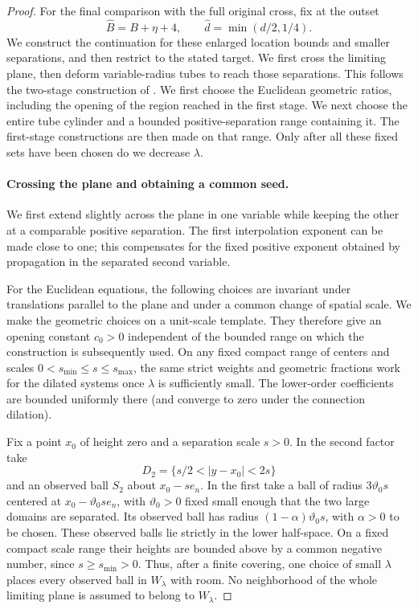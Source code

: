 \begin{proof}
For the final comparison with the full original cross, fix at the outset
\[
 \widehat B=B+\eta+4,\qquad
 \widehat d=\min(d/2,1/4).
\]
We construct the continuation for these enlarged location bounds and
smaller separations, and then restrict to the stated target.
We first cross the limiting plane, then deform variable-radius tubes
to reach those separations.  This follows the two-stage
construction of \cite[Section~3, ``Fixed-separation initialization'']{ScalarCompanion2026}.
We first choose the Euclidean geometric ratios, including the opening of
the region reached in the first stage.  We next choose the entire tube
cylinder and a bounded positive-separation range containing it.  The
first-stage constructions are then made on that range.  Only after all
these fixed sets have been chosen do we decrease $\lambda$.

\paragraph{Crossing the plane and obtaining a common seed.}
We first extend slightly across the plane in one variable while keeping
the other at a comparable positive separation. The first interpolation
exponent can be made close to one; this compensates for the fixed
positive exponent obtained by propagation in the separated second
variable.

For the Euclidean equations, the following choices are invariant under
translations parallel to the plane and under a common change of spatial
scale.  We make the geometric choices on a unit-scale template.  They
therefore give an opening constant $c_0>0$ independent of the bounded
range on which the construction is subsequently used.  On any fixed
compact range of centers and scales $0<s_{\min}\le s\le s_{\max}$,
the same strict weights and geometric fractions work for the dilated
systems once $\lambda$ is sufficiently small.  The lower-order
coefficients are bounded uniformly there (and converge to zero under
the connection dilation).

Fix a point $x_0$ of height zero and a separation scale $s>0$.
In the second factor take
\[
 D_2=\{s/2<|y-x_0|<2s\}
\]
and an observed ball $S_2$ about $x_0-se_n$.
In the first take a ball of radius $3\vartheta_0s$ centered at
$x_0-\vartheta_0se_n$, with $\vartheta_0>0$ fixed small enough that the two
large domains are separated.  Its observed ball has radius
$(1-\alpha)\vartheta_0s$, with $\alpha>0$ to be chosen.
These observed balls lie strictly in the lower half-space.  On a fixed
compact scale range their heights are bounded above by a common negative
number, since $s\ge s_{\min}>0$.  Thus, after a finite covering, one
choice of small $\lambda$ places every observed ball in $W_\lambda$
with room.  No neighborhood of the whole limiting plane is assumed to
belong to $W_\lambda$.


\end{proof}
